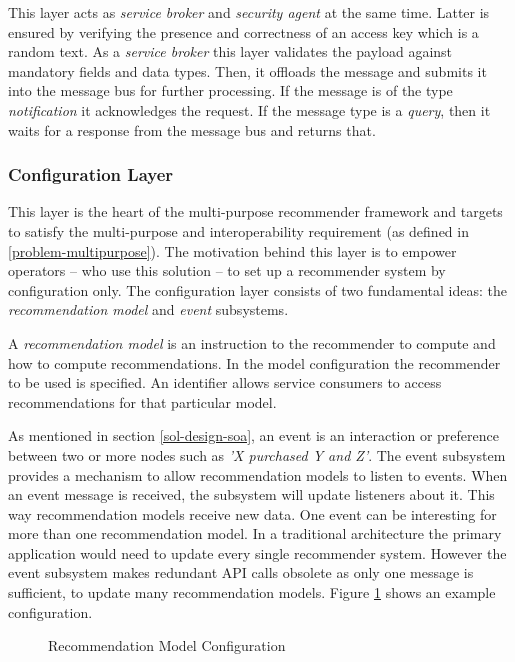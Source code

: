 This layer acts as \emph{service broker} and \emph{security agent} at the same time. Latter is ensured by verifying the presence and correctness of an access key which is a random text. As a \emph{service broker} this layer validates the payload against mandatory fields and data types. Then, it offloads the message and submits it into the message bus for further processing. If the message is of the type \emph{notification} it acknowledges the request. If the message type is a \emph{query}, then it waits for a response from the message bus and returns that.

\subsubsection{Configuration Layer}
\label{sol-design-layer-config}

This layer is the heart of the multi-purpose recommender framework and targets to satisfy the multi-purpose and interoperability requirement (as defined in \ref{problem-multipurpose}). The motivation behind this layer is to empower operators -- who use this solution -- to set up a recommender system by configuration only. The configuration layer consists of two fundamental ideas: the \emph{recommendation model} and \emph{event} subsystems.

A \emph{recommendation model} is an instruction to the recommender to compute and how to compute recommendations. In the model configuration the recommender to be used is specified. An identifier allows service consumers to access recommendations for that particular model.

As mentioned in section \ref{sol-design-soa}, an event is an interaction or preference between two or more nodes such as \emph{'X purchased Y and Z'}. The event subsystem provides a mechanism to allow recommendation models to listen to events. When an event message is received, the subsystem will update listeners about it. This way recommendation models receive new data. One event can be interesting for more than one recommendation model. In a traditional architecture the primary application would need to update every single recommender system. However the event subsystem makes redundant API calls obsolete as only one message is sufficient, to update many recommendation models. Figure \ref{lst:recomodel-config} shows an example configuration.

\begin{figure}[ht]
    \caption{Recommendation Model Configuration}
    \label{lst:recomodel-config}
\end{figure}

